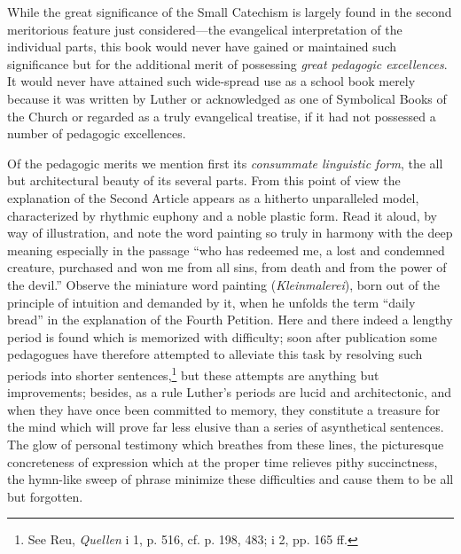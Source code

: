 While the great significance of the Small Catechism is largely found in the second meritorious feature just considered—the evangelical interpretation of the individual parts, this book would never have gained or maintained such significance but for the additional merit of possessing \emph{great pedagogic excellences}. It would never have attained such wide-spread use as a school book merely because it was written by Luther or acknowledged as one of Symbolical Books of the Church or regarded as a truly evangelical treatise, if it had not possessed a number of pedagogic excellences.

Of the pedagogic merits we mention first its \emph{consummate linguistic form}, the all but architectural beauty of its several parts. From this point of view the explanation of the Second Article appears as a hitherto unparalleled model, characterized by rhythmic euphony and a noble plastic form. Read it aloud, by way of illustration, and note the word painting so truly in harmony with the deep meaning especially in the passage “who has redeemed me, a lost and condemned creature, purchased and won me from all sins, from death and from the power of the devil.” Observe the miniature word painting (\emph{Kleinmalerei}), born out of the principle of intuition and demanded by it, when he unfolds the term “daily bread” in the explanation of the Fourth Petition. Here and there indeed a lengthy period is found which is memorized with difficulty; soon after publication some pedagogues have therefore attempted to alleviate this task by resolving such periods into shorter sentences,\footnote{See Reu, \emph{Quellen} i 1, p. 516, cf. p. 198, 483; i 2, pp. 165 ff.} but these attempts are anything but improvements; besides, as a rule Luther’s periods are lucid and architectonic, and when they have once
been committed to memory, they constitute a treasure for the mind which will prove far less elusive than a series of asynthetical sentences. The glow of personal testimony which breathes from these lines, the picturesque concreteness of expression which at the proper time relieves pithy succinctness, the hymn-like sweep of phrase minimize these difficulties and cause them to be all but forgotten.

